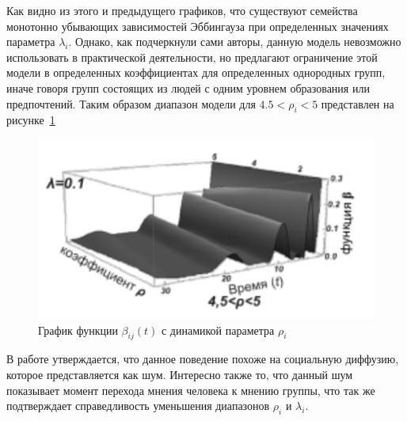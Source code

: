 Как видно из этого и предыдущего графиков, что существуют семейства монотонно убывающих зависимостей
Эббингауза при определенных значениях параметра $\lambda_{i}$.
Однако, как подчеркнули сами авторы, данную модель невозможно использовать в практической деятельности,
но предлагают ограничение этой модели в определенных коэффициентах для определенных однородных групп,
иначе говоря групп состоящих из людей с одним уровнем образования или предпочтений.
Таким образом диапазон модели для $4.5 < \rho_{i} < 5$ представлен на рисунке~\ref{fig:beta_4_5rho5}
\newpage
\begin{figure}[h!]
    \centering
    \captionsetup{justification=centering}
    \includegraphics[width=0.7\linewidth]{pictures/graphic_beta_45rho5.png}
    \caption{График функции $\beta_{ij}(t)$ с динамикой параметра $\rho_{i}$~\citep{pilkevich2015model}}
    \label{fig:beta_4_5rho5}
\end{figure}

В работе утверждается, что данное поведение похоже на социальную диффузию, которое представляется как
 шум\grqq.
Интересно также то, что данный шум показывает момент перехода мнения человека к мнению группы, что так
же подтверждает справедливость уменьшения диапазонов $\rho_{i}$ и $\lambda_{i}$.

